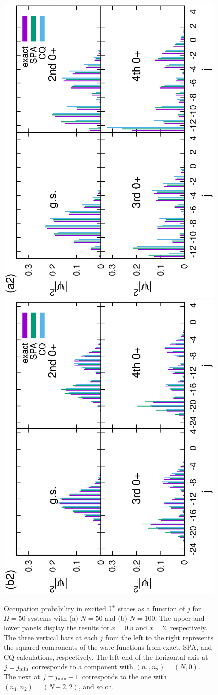 \documentclass[%
superscriptaddress,
preprint,
showpacs,
nofootinbib,
amsmath,amssymb,
aps,
prc,
floatfix ]%
{revtex4-1}
\begin{document}
\begin{figure}[t]
\begin{minipage}{1\hsize}
\begin{center}
\hspace{13pt}
\includegraphics[height=0.45\textwidth,angle=-90]{N50Xeq2occ_wo_adiabatic.eps}
\hspace{13pt}\includegraphics[height=0.45\textwidth,angle=-90]{N100Xeq2occ_wo_adiabatic.eps}
 \end{center}
 \end{minipage}
 \caption{
Occupation probability in excited $0^+$ states
as a function of $j$ for $\Omega=50$ systems
with (a) $N=50$ and (b) $N=100$.
The upper and lower panels display the results for $x=0.5$ and $x=2$,
respectively. 
The three vertical bars at each $j$ from the left to the right represents
the squared components of the wave functions
from exact, SPA, and CQ calculations, respectively.
The left end of the horizontal axis at $j=j_{\rm min}$
corresponds to a component with $(n_1,n_2)=(N,0)$.
The next at $j=j_{\rm min}+1$ corresponds to the one with
$(n_1,n_2)=(N-2,2)$, and so on.
}
 \label{fig:N50_occ}
\end{figure}
\end{document}
